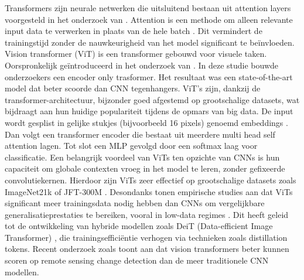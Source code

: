 Transformers zijn neurale netwerken die uitsluitend bestaan uit attention layers voorgesteld in het onderzoek van \textcite{Vaswani2017}.
Attention is een methode om alleen relevante input data te verwerken in plaats van de hele batch \autocite{Geron2022}. 
Dit vermindert de trainingstijd zonder de nauwkeurigheid van het model significant te beïnvloeden. 
\newline
\newline
Vision transformer (ViT) is een transformer gebouwd voor visuele taken. Oorspronkelijk geïntroduceerd in het onderzoek van \textcite{dosovitskiy2020image}.
In deze studie bouwde onderzoekers een encoder only trasformer. Het resultaat was een state-of-the-art model dat beter scoorde dan CNN tegenhangers.
ViT's zijn, dankzij de transformer-architectuur, bijzonder goed afgestemd op grootschalige datasets, wat bijdraagt aan hun huidige populariteit
tijdens de opmars van big data. 
De input wordt gesplist in gelijke stukjes (bijvoorbeeld 16 pixels) genoemd embeddings \autocite{dosovitskiy2020image}. Dan volgt 
een transformer encoder die bestaat uit meerdere multi head self attention lagen. Tot slot een MLP gevolgd door een softmax laag 
voor classificatie.
\newline
\newline
Een belangrijk voordeel van ViTs ten opzichte van CNNs is hun capaciteit om globale contexten vroeg in het model te leren, zonder gefixeerde convolutiekernen. 
Hierdoor zijn ViTs zeer effectief op grootschalige datasets zoals ImageNet21k of JFT-300M \autocite{dosovitskiy2020image}. Desondanks tonen empirische studies aan 
dat ViTs significant meer trainingsdata nodig hebben dan CNNs om vergelijkbare generalisatieprestaties te bereiken, vooral in low-data regimes \autocite{touvron2021training}. 
Dit heeft geleid tot de ontwikkeling van hybride modellen zoals DeiT (Data-efficient Image Transformer) \autocite{touvron2021training}, 
die trainingsefficiëntie verhogen via technieken zoals distillation tokens.
\newline
\newline
Recent onderzoek zoals \textcite{Bandara2022} toont aan dat vision transformers beter kunnen scoren op remote sensing change detection
dan de meer traditionele CNN modellen.
\newline
\newline


